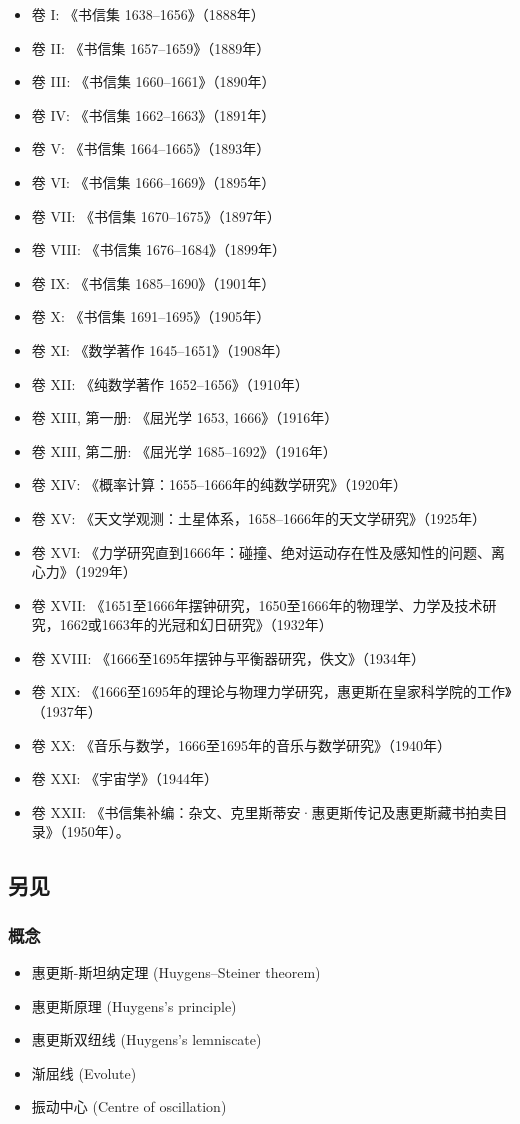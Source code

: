 \begin{itemize}
\item 卷 I: 《书信集 1638–1656》（1888年）
\item 卷 II: 《书信集 1657–1659》（1889年）
\item 卷 III: 《书信集 1660–1661》（1890年）
\item 卷 IV: 《书信集 1662–1663》（1891年）
\item 卷 V: 《书信集 1664–1665》（1893年）
\item 卷 VI: 《书信集 1666–1669》（1895年）
\item 卷 VII: 《书信集 1670–1675》（1897年）
\item 卷 VIII: 《书信集 1676–1684》（1899年）
\item 卷 IX: 《书信集 1685–1690》（1901年）
\item 卷 X: 《书信集 1691–1695》（1905年）
\item 卷 XI: 《数学著作 1645–1651》（1908年）
\item 卷 XII: 《纯数学著作 1652–1656》（1910年）
\item 卷 XIII, 第一册: 《屈光学 1653, 1666》（1916年）
\item 卷 XIII, 第二册: 《屈光学 1685–1692》（1916年）
\item 卷 XIV: 《概率计算：1655–1666年的纯数学研究》（1920年）
\item 卷 XV: 《天文学观测：土星体系，1658–1666年的天文学研究》（1925年）
\item 卷 XVI: 《力学研究直到1666年：碰撞、绝对运动存在性及感知性的问题、离心力》（1929年）
\item 卷 XVII: 《1651至1666年摆钟研究，1650至1666年的物理学、力学及技术研究，1662或1663年的光冠和幻日研究》（1932年）
\item 卷 XVIII: 《1666至1695年摆钟与平衡器研究，佚文》（1934年）
\item 卷 XIX: 《1666至1695年的理论与物理力学研究，惠更斯在皇家科学院的工作》（1937年）
\item 卷 XX: 《音乐与数学，1666至1695年的音乐与数学研究》（1940年）
\item 卷 XXI: 《宇宙学》（1944年）
\item 卷 XXII: 《书信集补编：杂文、克里斯蒂安·惠更斯传记及惠更斯藏书拍卖目录》（1950年）。
\end{itemize}
\subsection{另见}
\subsubsection{概念}
\begin{itemize}
\item 惠更斯-斯坦纳定理 (Huygens–Steiner theorem)
\item 惠更斯原理 (Huygens's principle)
\item 惠更斯双纽线 (Huygens's lemniscate)
\item 渐屈线 (Evolute)
\item 振动中心 (Centre of oscillation)
\end{itemize}

